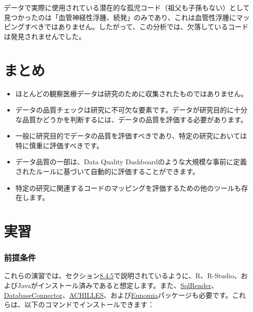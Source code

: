 \documentclass[
  11pt]{book}
\makeatletter
\newenvironment{kframe}{%
\medskip{}
\setlength{\fboxsep}{.8em}
 \def\at@end@of@kframe{}%
 \ifinner\ifhmode%
  \def\at@end@of@kframe{\end{minipage}}%
  \begin{minipage}{\columnwidth}%
 \fi\fi%
 \def\FrameCommand##1{\hskip\@totalleftmargin \hskip-\fboxsep
 \colorbox{myShadeColor}{##1}\hskip-\fboxsep
     \hskip-\linewidth \hskip-\@totalleftmargin \hskip\columnwidth}%
 \MakeFramed {\advance\hsize-\width
   \@totalleftmargin\z@ \linewidth\hsize
   \@setminipage}}%
 {\par\unskip\endMakeFramed%
 \at@end@of@kframe}
\newenvironment{rmdblock}[1]
  {
  \begin{itemize}
  \renewcommand{\labelitemi}{
    \raisebox{-.7\height}[0pt][0pt]{
      {\setkeys{Gin}{width=3em,keepaspectratio}\texttt{[image: images/\#1]}}
    }
  }
  \setlength{\fboxsep}{1em}
  \begin{kframe}
  \item
  }
  {
  \end{kframe}
  \end{itemize}
  }
\newenvironment{rmdsummary}
  {\begin{rmdblock}{summary}}
  {\end{rmdblock}}
\theoremstyle{definition}
\theoremstyle{definition}
\theoremstyle{definition}
\theoremstyle{definition}
\theoremstyle{remark}
\makeatother
\begin{document}
データで実際に使用されている潜在的な孤児コード（祖父も子孫もない）として見つかったのは「血管神経性浮腫、続発」のみであり、これは血管性浮腫にマッピングすべきではありません。したがって、この分析では、欠落しているコードは発見されませんでした。

\section{まとめ}\label{ux307eux3068ux3081-12}

\begin{rmdsummary}
\begin{itemize}
\item
  ほとんどの観察医療データは研究のために収集されたものではありません。
\item
  データの品質チェックは研究に不可欠な要素です。データが研究目的に十分な品質かどうかを判断するには、データの品質を評価する必要があります。
\item
  一般に研究目的でデータの品質を評価すべきであり、特定の研究においては特に慎重に評価すべきです。
\item
  データ品質の一部は、Data Quality Dashboardのような大規模な事前に定義されたルールに基づいて自動的に評価することができます。
\item
  特定の研究に関連するコードのマッピングを評価するための他のツールも存在します。
\end{itemize}
\end{rmdsummary}

\section{実習}\label{ux5b9fux7fd2}

\subsubsection*{前提条件}\label{ux524dux63d0ux6761ux4ef6-9}

これらの演習では、セクション\href{https://ohdsi.github.io/TheBookOfOhdsi/OhdsiAnalyticsTools.html\#installR}{8.4.5}で説明されているように、R、R-Studio、およびJavaがインストール済みであると想定します。また、\href{https://ohdsi.github.io/SqlRender/}{SqlRender}、\href{https://ohdsi.github.io/DatabaseConnector/}{DatabaseConnector}、\href{https://github.com/OHDSI/Achilles}{ACHILLES}、および\href{https://ohdsi.github.io/Eunomia/}{Eunomia}パッケージも必要です。これらは、以下のコマンドでインストールできます：
\end{document}

